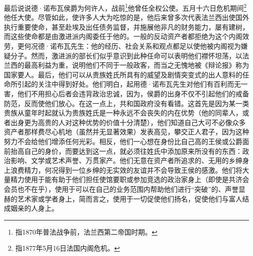 \par 最后说说德·诺布瓦侯爵为何许人，战前\footnote{指1870年普法战争前，法兰西第二帝国时期。}他曾任全权公使。五月十六日危机期间\footnote{指1877年5月16日法国内阁危机。}他任大使。尽管如此，使许多人大为吃惊的是，他后来曾多次代表法兰西出使国外执行重要使命，甚至赴埃及出任债务监督，并施展他非凡的财务能力，屡有建树，而这些使命都是由激进派内阁委任于他的。一般的反动资产者都拒绝为这个内阁效劳，更何况德·诺布瓦先生：他的经历、社会关系和观点都足以使他被内阁视为嫌疑分子。然而，激进派的部长们似乎意识到此种任命可以表明他们襟怀坦荡，以法兰西的最高利益为重，说明他们不同于一般政客，而当之无愧地被《辩论报》称为国家要人。最后，他们可以从贵族姓氏所具有的威望及剧情突变式的出人意料的任命所引起的关注中得到好处。他们明白，起用德·诺布瓦先生对他们有百利而无一害，他们不用担心后者会违背政治忠诚，因为，侯爵的出身不仅不引起他们的戒备防范，反而使他们放心。在这一点上，共和国政府没有看错。这首先是因为某一类贵族从童年时起就认为贵族姓氏是一种永远不会丧失的内在优势（他的同辈人，或者出身更为高贵的人对这种优势的价值十分清楚），他们知道自己大可不必像众多资产者那样费尽心机地（虽然并无显著效果）发表高见，攀交正人君子，因为这种努力不会给他们增添任何光彩。相反，他们一心想在身份比自己高的王侯或公爵面前抬高自己的身价，而要达到这一点，就必须往姓氏中添加原来所没有的东西：政治影响、文学或艺术声誉、万贯家产。他们无意在资产者所追求的、无用的乡绅身上浪费精力，何况得到一位乡绅的无实效的友谊并不会导致王侯的感激。他们将大量精力使用于能有助于他们担任使馆要职或参加竞选的政治家身上（即使是共济会会员也不在乎），使用于可以在自己的业务范围内帮助他们进行“突破”的、声誉显赫的艺术家或学者身上，简而言之，使用于一切促使他们扬名，促使他们与富人结成姻亲的人身上。
